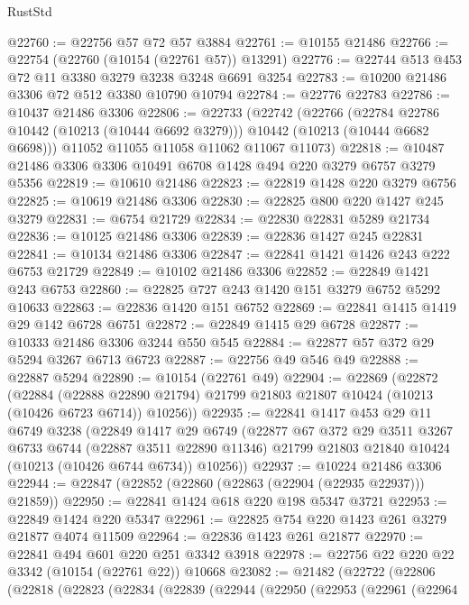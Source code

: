 \begin{lexlean}{RustStd}
\begin{coremodule}
@22760 := @22756 @57 @72 @57 @3884
@22761 := @10155 @21486
@22766 := @22754 (@22760 (@10154 (@22761 @57)) @13291)
@22776 := @22744 @513 @453 @72 @11 @3380 @3279 @3238 @3248 @6691 @3254
@22783 := @10200 @21486 @3306 @72 @512 @3380 @10790 @10794
@22784 := @22776 @22783
@22786 := @10437 @21486 @3306
@22806 := @22733
    (@22742
      (@22766
        (@22784 @22786 @10442 (@10213 (@10444 @6692 @3279)))
        @10442
        (@10213 (@10444 @6682 @6698)))
      @11052
      @11055
      @11058
      @11062
      @11067
      @11073)
@22818 := @10487 @21486 @3306 @3306 @10491 @6708 @1428 @494 @220 @3279 @6757 @3279 @5356
@22819 := @10610 @21486
@22823 := @22819 @1428 @220 @3279 @6756
@22825 := @10619 @21486 @3306
@22830 := @22825 @800 @220 @1427 @245 @3279
@22831 := @6754 @21729
@22834 := @22830 @22831 @5289 @21734
@22836 := @10125 @21486 @3306
@22839 := @22836 @1427 @245 @22831
@22841 := @10134 @21486 @3306
@22847 := @22841 @1421 @1426 @243 @222 @6753 @21729
@22849 := @10102 @21486 @3306
@22852 := @22849 @1421 @243 @6753
@22860 := @22825 @727 @243 @1420 @151 @3279 @6752 @5292 @10633
@22863 := @22836 @1420 @151 @6752
@22869 := @22841 @1415 @1419 @29 @142 @6728 @6751
@22872 := @22849 @1415 @29 @6728
@22877 := @10333 @21486 @3306 @3244 @550 @545
@22884 := @22877 @57 @372 @29 @5294 @3267 @6713 @6723
@22887 := @22756 @49 @546 @49
@22888 := @22887 @5294
@22890 := @10154 (@22761 @49)
@22904 := @22869
    (@22872
      (@22884
        (@22888 @22890 @21794)
        @21799
        @21803
        @21807
        @10424
        (@10213 (@10426 @6723 @6714))
        @10256))
@22935 := @22841
    @1417
    @453
    @29
    @11
    @6749
    @3238
    (@22849
      @1417
      @29
      @6749
      (@22877
        @67
        @372
        @29
        @3511
        @3267
        @6733
        @6744
        (@22887 @3511 @22890 @11346)
        @21799
        @21803
        @21840
        @10424
        (@10213 (@10426 @6744 @6734))
        @10256))
@22937 := @10224 @21486 @3306
@22944 := @22847 (@22852 (@22860 (@22863 (@22904 (@22935 @22937))) @21859))
@22950 := @22841 @1424 @618 @220 @198 @5347 @3721
@22953 := @22849 @1424 @220 @5347
@22961 := @22825 @754 @220 @1423 @261 @3279 @21877 @4074 @11509
@22964 := @22836 @1423 @261 @21877
@22970 := @22841 @494 @601 @220 @251 @3342 @3918
@22978 := @22756 @22 @220 @22 @3342 (@10154 (@22761 @22)) @10668
@23082 := @21482
    (@22722
      (@22806
        (@22818
          (@22823
            (@22834
              (@22839
                (@22944
                  (@22950
                    (@22953
                      (@22961
                        (@22964

\end{coremodule}
\end{lexlean}
